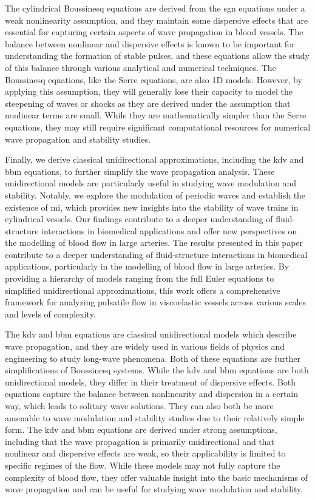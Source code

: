 \documentclass[alpha-refs, 12pt]{wiley-article}
\begin{document}
The cylindrical Boussinesq equations are derived from the \acrshort{sgn} equations under a weak nonlinearity assumption, and they maintain some dispersive effects that are essential for capturing certain aspects of wave propagation in blood vessels. The balance between nonlinear and dispersive effects is known to be important for understanding the formation of stable pulses, and these equations allow the study of this balance through various analytical and numerical techniques. The Boussinesq equations, like the Serre equations, are also 1D models. However, by applying this assumption, they will generally lose their capacity to model the steepening of waves or shocks as they are derived under the assumption that nonlinear terms are small. While they are mathematically simpler than the Serre equations, they may still require significant computational resources for numerical wave propagation and stability studies.

Finally, we derive classical unidirectional approximations, including the \acrfull{kdv} and \acrfull{bbm} equations, to further simplify the wave propagation analysis. These unidirectional models are particularly useful in studying wave modulation and stability. Notably, we explore the modulation of periodic waves and establish the existence of \acrfull{mi}, which provides new insights into the stability of wave trains in cylindrical vessels. Our findings contribute to a deeper understanding of fluid-structure interactions in biomedical applications and offer new perspectives on the modelling of blood flow in large arteries. The results presented in this paper contribute to a deeper understanding of fluid-structure interactions in biomedical applications, particularly in the modelling of blood flow in large arteries. By providing a hierarchy of models ranging from the full Euler equations to simplified unidirectional approximations, this work offers a comprehensive framework for analyzing pulsatile flow in viscoelastic vessels across various scales and levels of complexity.

The \acrfull{kdv} and \acrfull{bbm} equations are classical unidirectional models which describe wave propagation, and they are widely used in various fields of physics and engineering to study long-wave phenomena. Both of these equations are further simplifications of Boussinesq systems. While the \acrshort{kdv} and \acrshort{bbm} equations are both unidirectional models, they differ in their treatment of dispersive effects. Both equations capture the balance between nonlinearity and dispersion in a certain way, which leads to solitary wave solutions. They can also both be more amenable to wave modulation and stability studies due to their relatively simple form. The \acrshort{kdv} and \acrshort{bbm} equations are derived under strong assumptions, including that the wave propagation is primarily unidirectional and that nonlinear and dispersive effects are weak, so their applicability is limited to specific regimes of the flow. While these models may not fully capture the complexity of blood flow, they offer valuable insight into the basic mechanisms of wave propagation and can be useful for studying wave modulation and stability.
\end{document}
